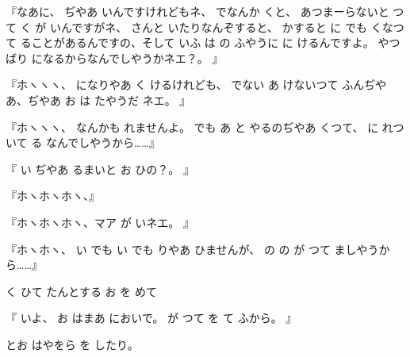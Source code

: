 『なあに、
ぢやあ
いんですけれどもネ、
でなんか
くと、
あつまーらないと
つて
く
が
いんですがネ、
さんと
いたりなんぞすると、
かすると
に
でも
くなつて
ることがあるんですの、そして
いふ
は
の
ふやうに
に
けるんですよ。
やつばり
になるからなんでしやうかネエ？。
』

『ホヽヽヽ、
になりやあ
く
けるけれども、
でない
あ
けないつて
ふんぢやあ、ぢやあ
お
は
たやうだ
ネエ。
』

『ホヽヽヽ、
なんかも
れませんよ。
でも
あ
と
やるのぢやあ
くつて、
に
れついて
る
なんでしやうから……』

『
い
ぢやあ
るまいと
お
ひの？。
』

『ホヽホヽホヽ、』

『ホヽホヽホヽ、マア
が
いネエ。
』

『ホヽホヽ、
い
でも
い
でも
りやあ
ひませんが、
の
の
が
つて
ましやうから……』

く
ひて
たんとする
お
を
めて

『
いよ、
お
はまあ
においで。
が
つて
を
て
ふから。
』

とお
はやをら
を
したり。

